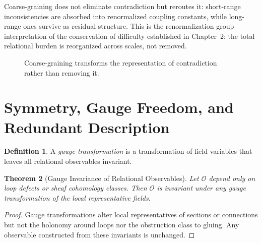 \documentclass[12pt,a4paper,openany]{book}
\theoremstyle{plain}
\newtheorem{theorem}{Theorem}[chapter]
\theoremstyle{definition}
\newtheorem{definition}[theorem]{Definition}
\theoremstyle{remark}
\begin{document}
Coarse-graining does not eliminate contradiction but reroutes it: short-range inconsistencies are absorbed into renormalized coupling constants, while long-range ones survive as residual structure. This is the renormalization group interpretation of the conservation of difficulty established in Chapter~2: the total relational burden is reorganized across scales, not removed.

\begin{figure}[h]
\centering
{}
\caption[Renormalization flow]{Coarse-graining transforms the representation of contradiction rather than removing it.}
\label{fig:glyph_renorm}
\end{figure}

\section{Symmetry, Gauge Freedom, and Redundant Description}
\label{sec:gauge_symmetry_rsvp}

\begin{definition}
A \emph{gauge transformation} is a transformation of field variables that leaves all relational observables invariant.
\end{definition}

\begin{theorem}[Gauge Invariance of Relational Observables]
Let $\mathcal{O}$ depend only on loop defects or sheaf cohomology classes. Then $\mathcal{O}$ is invariant under any gauge transformation of the local representative fields.
\end{theorem}

\begin{proof}
Gauge transformations alter local representatives of sections or connections but not the holonomy around loops nor the obstruction class to gluing. Any observable constructed from these invariants is unchanged.
\end{proof}
\end{document}
